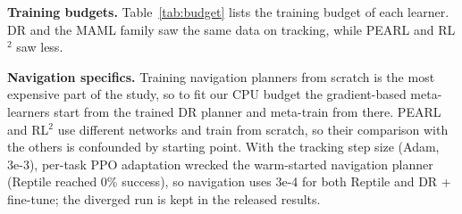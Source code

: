 \textbf{Training budgets.} Table~\ref{tab:budget} lists the training budget of each learner. DR and the MAML family saw the same data on tracking, while PEARL and RL$^2$ saw less.

\begin{table}[t]
\centering
\caption{Training budget in millions of environment steps.}
\label{tab:budget}
\footnotesize

\end{table}

\textbf{Navigation specifics.} Training navigation planners from scratch is the most expensive part of the study, so to fit our CPU budget the gradient-based meta-learners start from the trained DR planner and meta-train from there. PEARL and RL$^2$ use different networks and train from scratch, so their comparison with the others is confounded by starting point. With the tracking step size (Adam, 3e-3), per-task PPO adaptation wrecked the warm-started navigation planner (Reptile reached 0\% success), so navigation uses 3e-4 for both Reptile and DR + fine-tune; the diverged run is kept in the released results.
